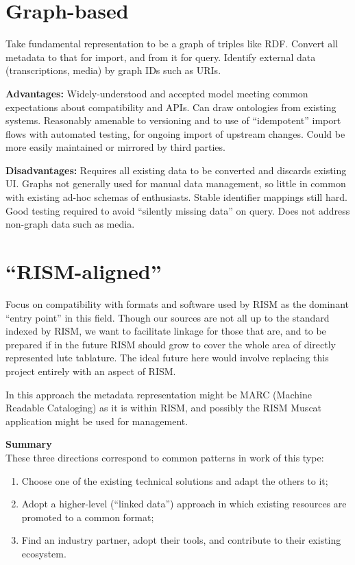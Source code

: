 \documentclass[a0,landscape]{a0poster}
\begin{document}
\begin{multicols}{3}
\begin{sloppypar}
  \section{Graph-based}

  Take fundamental representation to be a graph of triples like
  RDF. Convert all metadata to that for import, and from it for
  query. Identify external data (transcriptions, media) by graph IDs
  such as URIs.

  \noindent\textbf{Advantages:} Widely-understood and accepted model
  meeting common expectations about compatibility and APIs. Can draw
  ontologies from existing systems. Reasonably amenable to versioning
  and to use of ``idempotent'' import flows with automated testing,
  for ongoing import of upstream changes. Could be more easily
  maintained or mirrored by third parties.

  \noindent\textbf{Disadvantages:} Requires all existing data to be
  converted and discards existing UI. Graphs not generally used for
  manual data management, so little in common with existing ad-hoc
  schemas of enthusiasts. Stable identifier mappings still hard. Good
  testing required to avoid ``silently missing data'' on query. Does
  not address non-graph data such as media.
  
  \section{``RISM-aligned''}

  Focus on compatibility with formats and software used by RISM as the
  dominant ``entry point'' in this field. Though our sources are not
  all up to the standard indexed by RISM, we want to facilitate
  linkage for those that are, and to be prepared if in the future RISM
  should grow to cover the whole area of directly represented lute
  tablature. The ideal future here would involve replacing this
  project entirely with an aspect of RISM.

  \noindent In this approach the metadata representation might be MARC
  (Machine Readable Cataloging) as it is within RISM, and possibly the
  RISM Muscat application might be used for management.

  \vspace{2cm}
  \noindent\textbf{\LARGE Summary}\\

  \noindent These three directions correspond to common patterns in
  work of this type:

  \begin{enumerate}
  \item Choose one of the existing technical solutions and adapt the
    others to it;
  \item Adopt a higher-level (``linked data'') approach in which
    existing resources are promoted to a common format;
  \item Find an industry partner, adopt their tools, and contribute to
    their existing ecosystem.
  \end{enumerate}
  
\end{sloppypar}
  
\end{multicols}
\end{document}
